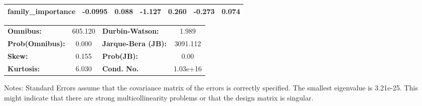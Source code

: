 \begin{center}
\begin{tabular}{lcccccc}
\textbf{family\_importance}     &      -0.0995  &        0.088     &    -1.127  &         0.260        &       -0.273    &        0.074     \\
\bottomrule
\end{tabular}
\begin{tabular}{lclc}
\textbf{Omnibus:}       & 605.120 & \textbf{  Durbin-Watson:     } &    1.989  \\
\textbf{Prob(Omnibus):} &   0.000 & \textbf{  Jarque-Bera (JB):  } & 3091.112  \\
\textbf{Skew:}          &   0.155 & \textbf{  Prob(JB):          } &     0.00  \\
\textbf{Kurtosis:}      &   6.030 & \textbf{  Cond. No.          } & 1.03e+16  \\
\bottomrule
\end{tabular}
\end{center}

Notes: \newline
 [1] Standard Errors assume that the covariance matrix of the errors is correctly specified. \newline
 [2] The smallest eigenvalue is 3.21e-25. This might indicate that there are \newline
 strong multicollinearity problems or that the design matrix is singular.